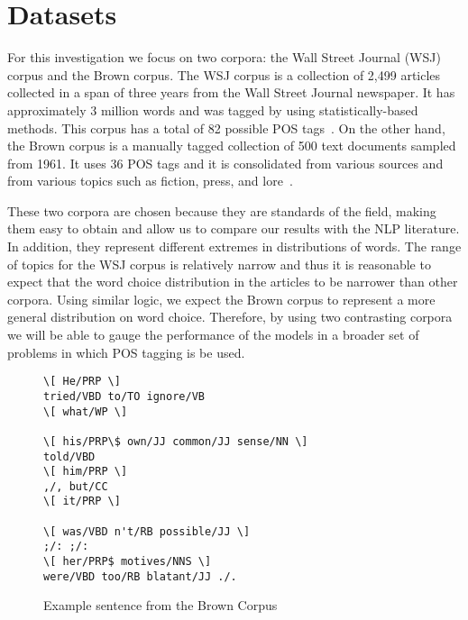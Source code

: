 
\section{Datasets}
For this investigation we focus on two corpora: the Wall Street Journal (WSJ) corpus and the Brown corpus. The WSJ corpus is a collection of 2,499 articles collected in a span of three years from the Wall Street Journal newspaper. It has approximately 3 million words and was tagged by using statistically-based methods. This corpus has a total of 82 possible POS tags~\cite{wsjCorpus}. On the other hand, the Brown corpus is a manually tagged collection of 500 text documents sampled from 1961. It uses 36 POS tags and it is consolidated from various sources and from various topics such as fiction, press, and lore~\cite{brownCorpus}.

These two corpora are chosen because they are standards of the field, making them easy to obtain and allow us to compare our results with the NLP literature. In addition, they represent different extremes in distributions of words. The range of topics for the WSJ corpus is relatively narrow and thus it is reasonable to expect that the word choice distribution in the articles to be narrower than other corpora. Using similar logic, we expect the Brown corpus to represent a more general distribution on word choice. Therefore, by using two contrasting corpora we will be able to gauge the performance of the models in a broader set of problems in which POS tagging is be used.

\begin{figure}[ht]
 \begin{Verbatim}[frame=single,framesep=5mm]
\[ He/PRP \]
tried/VBD to/TO ignore/VB
\[ what/WP \]

\[ his/PRP\$ own/JJ common/JJ sense/NN \]
told/VBD
\[ him/PRP \]
,/, but/CC
\[ it/PRP \]

\[ was/VBD n't/RB possible/JJ \]
;/: ;/:
\[ her/PRP$ motives/NNS \]
were/VBD too/RB blatant/JJ ./.
\end{Verbatim}
\caption{Example sentence from the Brown Corpus~\cite{brownCorpus} \label{brownExample}}
\end{figure}
